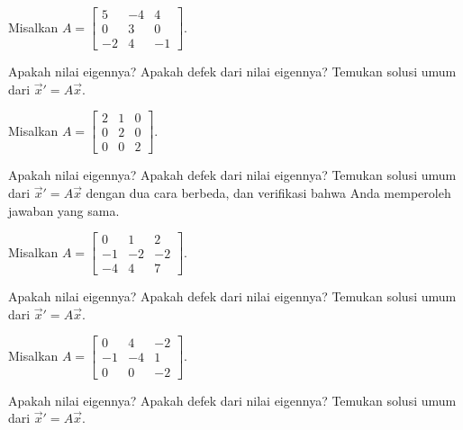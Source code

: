 \begin{samepage}
\begin{exercise}
Misalkan
$A = \left[ \begin{smallmatrix}
5 & -4 & 4 \\
0 & 3 & 0 \\
-2 & 4 & -1
\end{smallmatrix} \right]$.
\begin{tasks}
\task Apakah nilai eigennya?
\task Apakah defek dari nilai eigennya?
\task Temukan solusi umum dari ${\vec{x}}' = A \vec{x}$.
\end{tasks}
\end{exercise}
\end{samepage}


\begin{exercise}
Misalkan
$A = \left[ \begin{smallmatrix} 2 & 1 & 0 \\ 0 & 2 & 0 \\ 0 & 0 & 2 \end{smallmatrix} \right]$.
\begin{tasks}
\task Apakah nilai eigennya?
\task Apakah defek dari nilai eigennya?
\task Temukan solusi umum dari ${\vec{x}}' = A \vec{x}$ dengan dua cara berbeda,
dan verifikasi bahwa Anda memperoleh jawaban yang sama.
\end{tasks}
\end{exercise}

\begin{exercise}
Misalkan
$A = \left[ \begin{smallmatrix}
0 & 1 & 2 \\
-1 & -2 & -2 \\
-4 & 4 & 7
\end{smallmatrix} \right]$.
\begin{tasks}
\task Apakah nilai eigennya?
\task Apakah defek dari nilai eigennya?
\task Temukan solusi umum dari ${\vec{x}}' = A \vec{x}$.
\end{tasks}
\end{exercise}

\begin{exercise}
\pagebreak[2]
Misalkan
$A = \left[ \begin{smallmatrix}
0 & 4 & -2 \\
-1 & -4 & 1 \\
0 & 0 & -2
\end{smallmatrix} \right]$.
\begin{tasks}
\task Apakah nilai eigennya?
\task Apakah defek dari nilai eigennya?
\task Temukan solusi umum dari ${\vec{x}}' = A \vec{x}$.
\end{tasks}
\end{exercise}


